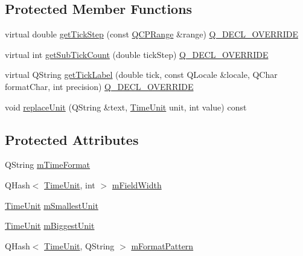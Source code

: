 \subsection*{Protected Member Functions}
\begin{DoxyCompactItemize}
\item 
virtual double \hyperlink{class_q_c_p_axis_ticker_time_a5615064642090fe193797caea8b98cb4}{get\+Tick\+Step} (const \hyperlink{class_q_c_p_range}{Q\+C\+P\+Range} \&range) \hyperlink{qcustomplot_8h_a42cc5eaeb25b85f8b52d2a4b94c56f55}{Q\+\_\+\+D\+E\+C\+L\+\_\+\+O\+V\+E\+R\+R\+I\+DE}
\item 
virtual int \hyperlink{class_q_c_p_axis_ticker_time_acace84c46598176aa53837e147595471}{get\+Sub\+Tick\+Count} (double tick\+Step) \hyperlink{qcustomplot_8h_a42cc5eaeb25b85f8b52d2a4b94c56f55}{Q\+\_\+\+D\+E\+C\+L\+\_\+\+O\+V\+E\+R\+R\+I\+DE}
\item 
virtual Q\+String \hyperlink{class_q_c_p_axis_ticker_time_a046eb771bdf2a959f570db542b3a0be6}{get\+Tick\+Label} (double tick, const Q\+Locale \&locale, Q\+Char format\+Char, int precision) \hyperlink{qcustomplot_8h_a42cc5eaeb25b85f8b52d2a4b94c56f55}{Q\+\_\+\+D\+E\+C\+L\+\_\+\+O\+V\+E\+R\+R\+I\+DE}
\item 
void \hyperlink{class_q_c_p_axis_ticker_time_a03b6c980be36f2672e3fc31d109a28a0}{replace\+Unit} (Q\+String \&text, \hyperlink{class_q_c_p_axis_ticker_time_a5c48ded8c6d3a1aca9b68219469fea3e}{Time\+Unit} unit, int value) const
\end{DoxyCompactItemize}
\subsection*{Protected Attributes}
\begin{DoxyCompactItemize}
\item 
Q\+String \hyperlink{class_q_c_p_axis_ticker_time_a800af3fe0a7c1a8110c043b82169bc9d}{m\+Time\+Format}
\item 
Q\+Hash$<$ \hyperlink{class_q_c_p_axis_ticker_time_a5c48ded8c6d3a1aca9b68219469fea3e}{Time\+Unit}, int $>$ \hyperlink{class_q_c_p_axis_ticker_time_a58305b56f847bcab8b3c852a21bdb91a}{m\+Field\+Width}
\item 
\hyperlink{class_q_c_p_axis_ticker_time_a5c48ded8c6d3a1aca9b68219469fea3e}{Time\+Unit} \hyperlink{class_q_c_p_axis_ticker_time_a61033c493cec76a69628d1aaa5b07abf}{m\+Smallest\+Unit}
\item 
\hyperlink{class_q_c_p_axis_ticker_time_a5c48ded8c6d3a1aca9b68219469fea3e}{Time\+Unit} \hyperlink{class_q_c_p_axis_ticker_time_a349b2debe07adc591996aa73dec9a757}{m\+Biggest\+Unit}
\item 
Q\+Hash$<$ \hyperlink{class_q_c_p_axis_ticker_time_a5c48ded8c6d3a1aca9b68219469fea3e}{Time\+Unit}, Q\+String $>$ \hyperlink{class_q_c_p_axis_ticker_time_adfc8221afbccb99343aa61f75419908d}{m\+Format\+Pattern}
\end{DoxyCompactItemize}


